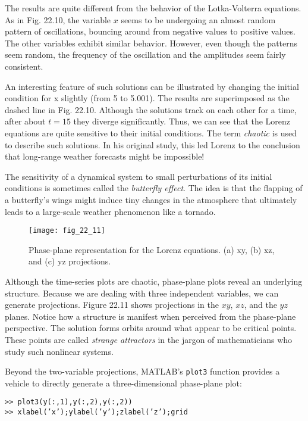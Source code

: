 \documentclass[../main.tex]{subfiles}
\begin{document}
The results are quite different from the behavior of the Lotka-Volterra equations. As in
Fig. 22.10, the variable $x$ seems to be undergoing an almost random pattern of oscillations,
bouncing around from negative values to positive values. The other variables exhibit
similar behavior. However, even though the patterns seem random, the frequency of the
oscillation and the amplitudes seem fairly consistent.

An interesting feature of such solutions can be illustrated by changing the initial condition for x slightly (from 5 to 5.001). The results are superimposed as the dashed line in
Fig. 22.10. Although the solutions track on each other for a time, after about $t = 15$ they
diverge significantly. Thus, we can see that the Lorenz equations are quite sensitive to
their initial conditions. The term \textit{chaotic} is used to describe such solutions. In his original study, this led Lorenz to the conclusion that long-range weather forecasts might be
impossible!

The sensitivity of a dynamical system to small perturbations of its initial conditions is
sometimes called the \textit{butterfly effect}. The idea is that the flapping of a butterfly's wings
might induce tiny changes in the atmosphere that ultimately leads to a large-scale weather
phenomenon like a tornado.

\begin{figure}[H]
    \centering
    \texttt{[image: fig\_22\_11]}
   \caption{\textsf{Phase-plane representation for the Lorenz equations. (a) xy, (b) xz, and (c) yz projections.}}\label{fig:fig_22_11}
\end{figure}

Although the time-series plots are chaotic, phase-plane plots reveal an underlying
structure. Because we are dealing with three independent variables, we can generate
projections. Figure 22.11 shows projections in the $xy$, $xz$, and the $yz$ planes. Notice how a
structure is manifest when perceived from the phase-plane perspective. The solution forms
orbits around what appear to be critical points. These points are called \textit{strange attractors} in
the jargon of mathematicians who study such nonlinear systems.

Beyond the two-variable projections, MATLAB's \texttt{plot3} function provides a vehicle
to directly generate a three-dimensional phase-plane plot:\vspace{\medskipamount}

\noindent\texttt{>> plot3(y(:,1),y(:,2),y(:,2))\\
>> xlabel('x');ylabel('y');zlabel('z');grid}\vspace{\medskipamount}
\end{document}
